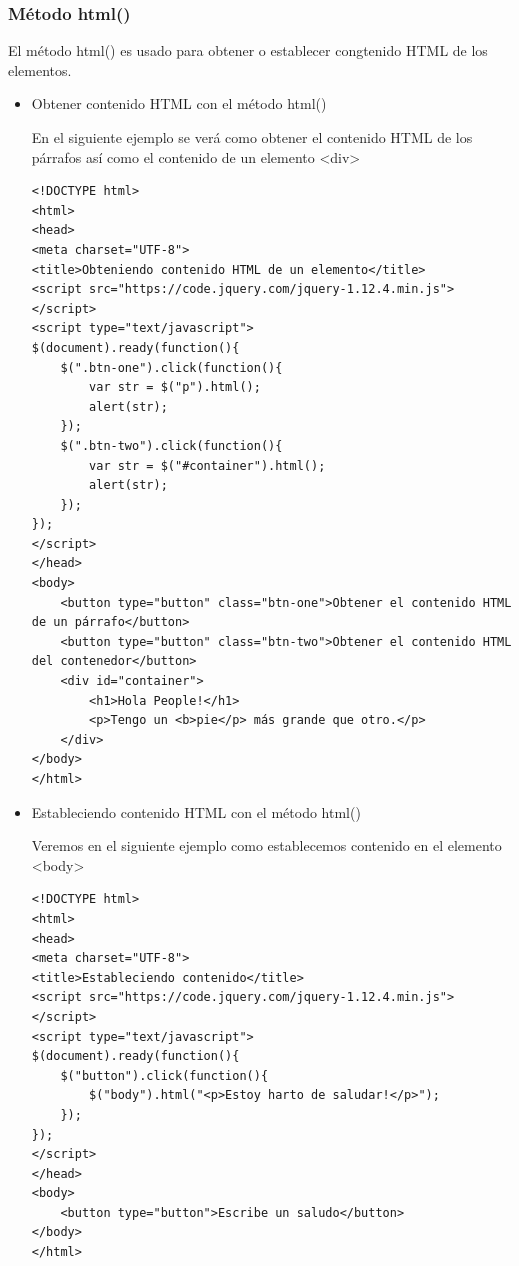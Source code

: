 \documentclass[11pt]{article}
\begin{document}
\subsubsection*{Método html()}
\label{sec:orga634e5f}

El método html() es usado para obtener o establecer congtenido HTML de los elementos.

\begin{itemize}
\item Obtener contenido HTML con el método html()
\label{sec:org3c36be2}

En el siguiente ejemplo se verá como obtener el contenido HTML de los párrafos así como el contenido de un elemento <div>

\begin{verbatim}
<!DOCTYPE html>
<html>
<head>
<meta charset="UTF-8">
<title>Obteniendo contenido HTML de un elemento</title>
<script src="https://code.jquery.com/jquery-1.12.4.min.js"></script>
<script type="text/javascript">
$(document).ready(function(){
    $(".btn-one").click(function(){
        var str = $("p").html();
        alert(str);
    });
    $(".btn-two").click(function(){
        var str = $("#container").html();
        alert(str);
    });
});
</script>
</head>
<body>
    <button type="button" class="btn-one">Obtener el contenido HTML de un párrafo</button>
    <button type="button" class="btn-two">Obtener el contenido HTML del contenedor</button>
    <div id="container">
        <h1>Hola People!</h1>
        <p>Tengo un <b>pie</p> más grande que otro.</p>
    </div>
</body>
</html>                                		
\end{verbatim}

\item Estableciendo contenido HTML con el método html()
\label{sec:orgaa9d870}

Veremos en el siguiente ejemplo como establecemos contenido en el elemento <body>

\begin{verbatim}
<!DOCTYPE html>
<html>
<head>
<meta charset="UTF-8">
<title>Estableciendo contenido</title>
<script src="https://code.jquery.com/jquery-1.12.4.min.js"></script>
<script type="text/javascript">
$(document).ready(function(){
    $("button").click(function(){
        $("body").html("<p>Estoy harto de saludar!</p>");
    });
});
</script>
</head>
<body>
    <button type="button">Escribe un saludo</button>
</body>
</html>                                		
\end{verbatim}
\end{itemize}
\end{document}
